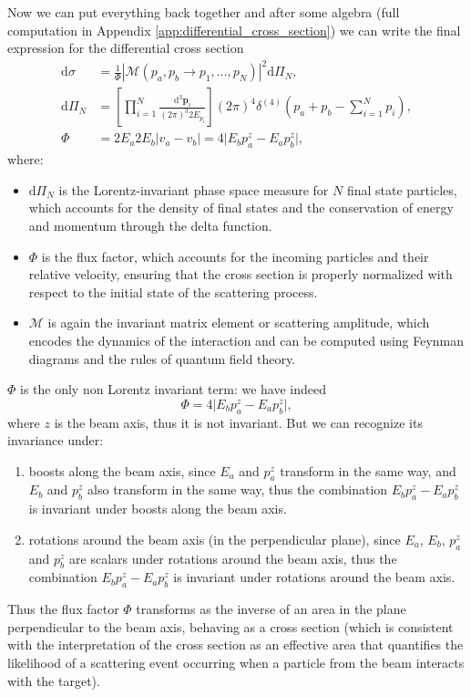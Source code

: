 Now we can put everything back together and after some algebra (full computation in Appendix \ref{app:differential_cross_section}) we can write the final expression for the differential cross section
\[
    \begin{aligned}
        \mathrm{d} \sigma & = \frac{1}{\Phi} |\mathcal{M} (p_a, p_b \to p_1, \ldots, p_N)|^2 \mathrm{d} \Pi_N,                                                       \\
        \mathrm{d} \Pi_N  & = \left[ \prod_{i=1}^N \frac{\mathrm{d}^3 \mathbf{p}_i}{(2\pi)^3 2 E_{p_i}} \right] (2\pi)^4 \delta^{(4)}(p_a + p_b - \sum_{i=1}^N p_i), \\
        \Phi              & = 2 E_a 2 E_b \vert v_a - v_b \vert = 4 \vert E_b p_a^z - E_a p_b^z \vert,
    \end{aligned}
\]
where:
\begin{itemize}
    \item \(\mathrm{d} \Pi_N\) is the Lorentz-invariant phase space measure for \(N\) final state particles, which accounts for the density of final states and the conservation of energy and momentum through the delta function.
    \item \(\Phi\) is the flux factor, which accounts for the incoming particles and their relative velocity, ensuring that the cross section is properly normalized with respect to the initial state of the scattering process.
    \item \(\mathcal{M}\) is again the invariant matrix element or scattering amplitude, which encodes the dynamics of the interaction and can be computed using Feynman diagrams and the rules of quantum field theory.
\end{itemize}

\(\Phi\) is the only non Lorentz invariant term: we have indeed
\[
    \Phi = 4 \vert E_b p_a^z - E_a p_b^z \vert,
\]
where \(z\) is the beam axis, thus it is not invariant. But we can recognize its invariance under:
\begin{enumerate}
    \item boosts along the beam axis, since \(E_a\) and \(p_a^z\) transform in the same way, and \(E_b\) and \(p_b^z\) also transform in the same way, thus the combination \(E_b p_a^z - E_a p_b^z\) is invariant under boosts along the beam axis.
    \item rotations around the beam axis (in the perpendicular plane), since \(E_a\), \(E_b\), \(p_a^z\) and \(p_b^z\) are scalars under rotations around the beam axis, thus the combination \(E_b p_a^z - E_a p_b^z\) is invariant under rotations around the beam axis.
\end{enumerate}
Thus the flux factor \(\Phi\) transforms as the inverse of an area in the plane perpendicular to the beam axis, behaving as a cross section (which is consistent with the interpretation of the cross section as an effective area that quantifies the likelihood of a scattering event occurring when a particle from the beam interacts with the target).

